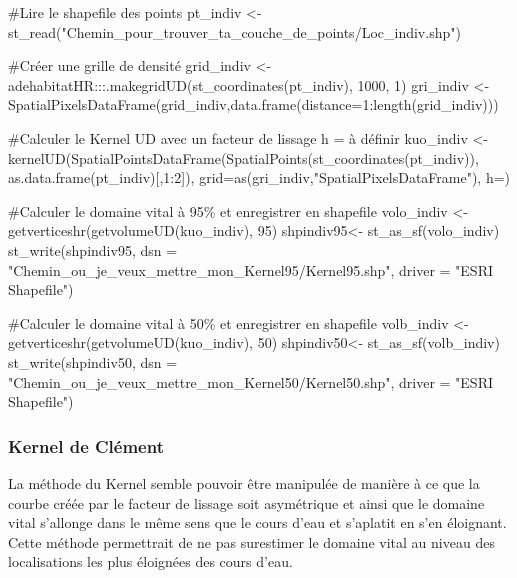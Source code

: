 \documentclass[
  letterpaper,
  DIV=11,
  numbers=noendperiod]{scrreprt}
\newenvironment{Shaded}{\begin{snugshade}}{\end{snugshade}}
\newcommand{\CommentTok}[1]{\textcolor[rgb]{0.37,0.37,0.37}{#1}}
\newcommand{\NormalTok}[1]{\textcolor[rgb]{0.00,0.23,0.31}{#1}}
\newcommand{\OtherTok}[1]{\textcolor[rgb]{0.00,0.23,0.31}{#1}}
\begin{document}
\begin{Shaded}
\begin{Highlighting}[]
\NormalTok{\#Lire le shapefile des points}
\NormalTok{pt\_indiv \textless{}{-} st\_read("Chemin\_pour\_trouver\_ta\_couche\_de\_points/Loc\_indiv.shp")}

\NormalTok{\#Créer une grille de densité}
\NormalTok{grid\_indiv \textless{}{-} adehabitatHR:::.makegridUD(st\_coordinates(pt\_indiv), 1000, 1)}
\NormalTok{gri\_indiv \textless{}{-} SpatialPixelsDataFrame(grid\_indiv,data.frame(distance=1:length(grid\_indiv)))}

\NormalTok{\#Calculer le Kernel UD avec un facteur de lissage h = \textquotesingle{}à définir\textquotesingle{}}
\NormalTok{kuo\_indiv \textless{}{-} kernelUD(SpatialPointsDataFrame(SpatialPoints(st\_coordinates(pt\_indiv)),}
\NormalTok{                                            as.data.frame(pt\_indiv)}\CommentTok{[}\OtherTok{,1:2}\CommentTok{]}\NormalTok{),}
\NormalTok{                     grid=as(gri\_indiv,"SpatialPixelsDataFrame"), h=)}

\NormalTok{\#Calculer le domaine vital à 95\% et enregistrer en shapefile}
\NormalTok{volo\_indiv \textless{}{-} getverticeshr(getvolumeUD(kuo\_indiv), 95)}
\NormalTok{shpindiv95\textless{}{-} st\_as\_sf(volo\_indiv)}
\NormalTok{st\_write(shpindiv95, dsn = "Chemin\_ou\_je\_veux\_mettre\_mon\_Kernel95/Kernel95.shp", driver = "ESRI Shapefile")}

\NormalTok{\#Calculer le domaine vital à 50\% et enregistrer en shapefile}
\NormalTok{volb\_indiv \textless{}{-} getverticeshr(getvolumeUD(kuo\_indiv), 50)}
\NormalTok{shpindiv50\textless{}{-} st\_as\_sf(volb\_indiv)}
\NormalTok{st\_write(shpindiv50, dsn = "Chemin\_ou\_je\_veux\_mettre\_mon\_Kernel50/Kernel50.shp", driver = "ESRI Shapefile")}
\end{Highlighting}
\end{Shaded}

\subsubsection{Kernel de Clément}\label{kernel-de-cluxe9ment}

La méthode du Kernel semble pouvoir être manipulée de manière à ce que
la courbe créée par le facteur de lissage soit asymétrique et ainsi que
le domaine vital s'allonge dans le même sens que le cours d'eau et
s'aplatit en s'en éloignant. Cette méthode permettrait de ne pas
surestimer le domaine vital au niveau des localisations les plus
éloignées des cours d'eau.
\end{document}

